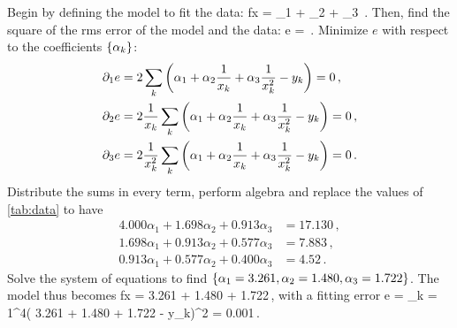 Begin by defining the model to fit the data:
\beq
    f\vat x = \alpha_1 + \alpha_2  + \alpha_3 \,.
\eeq
%
Then, find the square of the rms error of the model and the data:
%
\beq
    e = \,.    
\eeq
%
Minimize $e$ with respect to the coefficients $\left\lbrace{\alpha_k}\right\rbrace$:
%
\begin{align*}
%
\ipd 1e &= 2\ssum{k}{\left(\alpha_1 + \alpha_2\dfrac{1}{x_k} + \alpha_3\dfrac{1}{x_k^2} - y_k\right)} = 0\,,\\
%
\ipd 2e &= 2\dfrac{1}{x_k}\ssum{k}{\left(\alpha_1 + \alpha_2\dfrac{1}{x_k} + \alpha_3\dfrac{1}{x_k^2} - y_k\right)} = 0\,,\\
%
\ipd 3e &= 2\dfrac{1}{x^2_k}\ssum{k}{\left(\alpha_1 + \alpha_2\dfrac{1}{x_k} + \alpha_3\dfrac{1}{x_k^2} - y_k\right)} = 0\,.
%
\end{align*}
%
Distribute the sums in every term, perform algebra and replace the values of \cref{tab:data} to have
%
\begin{align*}
    4.000\alpha_1 + 1.698\alpha_2 + 0.913\alpha_3 &= 17.130\,,\\
    1.698\alpha_1 + 0.913\alpha_2 + 0.577\alpha_3 &= 7.883\,,\\
    0.913\alpha_1 + 0.577\alpha_2 + 0.400\alpha_3 &= 4.52\,.
\end{align*}
%
Solve the system of equations to find $\left\lbrace{\alpha_1 = 3.261, \alpha_2 = 1.480, \alpha_3 = 1.722}\right\rbrace$. The model thus becomes
%
\beq
    f\vat x = 3.261 + 1.480 + 1.722\,,
\eeq
%
with a fitting error
%
\beq
    e = \sum_{k = 1}^4\left( 3.261 + 1.480 + 1.722 - y_k\right)^2 
      = 0.001\,. \mqed
\eeq

